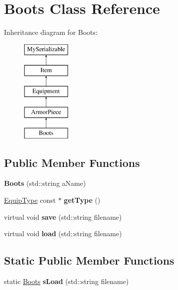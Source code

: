 \hypertarget{class_boots}{}\section{Boots Class Reference}
\label{class_boots}
Inheritance diagram for Boots\+:\begin{figure}[H]
\begin{center}
\leavevmode
\includegraphics[height=5.000000cm]{class_boots}
\end{center}
\end{figure}
\subsection*{Public Member Functions}
\begin{DoxyCompactItemize}
\item 
\hypertarget{class_boots_a9f8200d7192fb8c315292d8e55146b4a}{}\label{class_boots_a9f8200d7192fb8c315292d8e55146b4a} 
{\bfseries Boots} (std\+::string a\+Name)
\item 
\hypertarget{class_boots_a8c470e56ee8b265014a76320371eadf8}{}\label{class_boots_a8c470e56ee8b265014a76320371eadf8} 
\hyperlink{class_equip_type}{Equip\+Type} const  $\ast$ {\bfseries get\+Type} ()
\item 
\hypertarget{class_boots_a79899d063871ea3d23ff4f3beec91614}{}\label{class_boots_a79899d063871ea3d23ff4f3beec91614} 
virtual void {\bfseries save} (std\+::string filename)
\item 
\hypertarget{class_boots_a4a5857c4ea9d9dedfdc2fc7fe4e6436e}{}\label{class_boots_a4a5857c4ea9d9dedfdc2fc7fe4e6436e} 
virtual void {\bfseries load} (std\+::string filename)
\end{DoxyCompactItemize}
\subsection*{Static Public Member Functions}
\begin{DoxyCompactItemize}
\item 
\hypertarget{class_boots_aaf2b559fc88cb0df3497c02d85d48d24}{}\label{class_boots_aaf2b559fc88cb0df3497c02d85d48d24} 
static \hyperlink{class_boots}{Boots} {\bfseries s\+Load} (std\+::string filename)
\end{DoxyCompactItemize}

